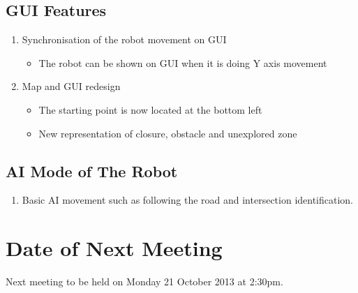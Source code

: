 \documentclass[11pt, a4paper]{article}
\begin{document}
\subsection{GUI Features}
\begin {enumerate}

\item Synchronisation of the robot movement on GUI

\begin{itemize}
\item The robot can be shown on GUI when it is doing Y axis movement
\end{itemize}

\item Map and GUI redesign

\begin{itemize}
\item The starting point is now located at the bottom left
\item New representation of closure, obstacle and unexplored zone
\end{itemize}

\end {enumerate}

\subsection{AI Mode of The Robot}
\begin {enumerate}
\item Basic AI movement such as following the road and intersection identification.
\end {enumerate}





\section{Date of Next Meeting}
\noindent Next meeting to be held on Monday 21 October 2013 at 2:30pm.
\end{document}
